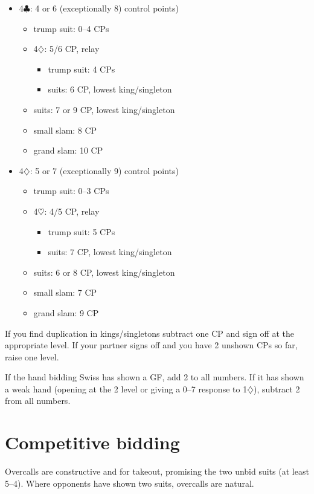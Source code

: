 \documentclass[a4paper,12pt]{article}
\begin{document}
\begin{itemize}
\item 4$\clubsuit$: 4 or 6 (exceptionally 8) control points)
	\begin{itemize}
   \item trump suit: 0--4 CPs
   \item 4$\diamondsuit$: 5/6 CP, relay
		\begin{itemize}
      \item trump suit: 4 CPs
      \item suits: 6 CP, lowest king/singleton
		\end{itemize}
   \item suits: 7 or 9 CP, lowest king/singleton
   \item small slam: 8 CP
   \item grand slam: 10 CP
	\end{itemize}

\item 4$\diamondsuit$: 5 or 7 (exceptionally 9) control points)
	\begin{itemize}
   \item trump suit: 0--3 CPs
   \item 4$\heartsuit$: 4/5 CP, relay
		\begin{itemize}
      \item trump suit: 5 CPs
      \item suits: 7 CP, lowest king/singleton
		\end{itemize}
   \item suits: 6 or 8 CP, lowest king/singleton
   \item small slam: 7 CP
   \item grand slam: 9 CP
	\end{itemize}
\end{itemize}

If you find duplication in kings/singletons subtract one CP and sign off at the
appropriate level. If your partner signs off and you have 2 unshown CPs so far,
raise one level.

If the hand bidding Swiss has shown a GF, add 2 to all numbers. If it has shown
a weak hand (opening at the 2 level or giving a 0--7 response to 1$\diamondsuit$), subtract 2
from all numbers.

\section{Competitive bidding}

Overcalls are constructive and for takeout, promising the two unbid suits (at least 5--4).
Where opponents have shown two suits, overcalls are natural.
\end{document}

